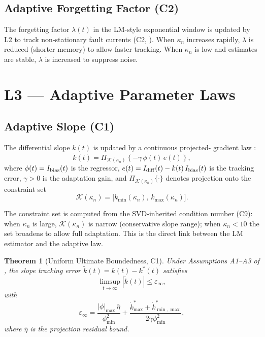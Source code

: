 \documentclass[journal,twoside,10pt]{IEEEtran}
\newcommand{\kappan}{\kappa_{n}}
\newcommand{\calK}{\mathcal{K}}
\newcommand{\Proj}[1]{\Pi_{#1}}
\newtheorem{theorem}{Theorem}
\begin{document}
\subsection{Adaptive Forgetting Factor (C2)}

The forgetting factor $\lambda(t)$ in the LM-style exponential window
is updated by L2 to track non-stationary fault currents (C2,
\cite{sambps_c2_adaptive_lambda}).  When $\kappan$ increases rapidly,
$\lambda$ is reduced (shorter memory) to allow faster tracking.
When $\kappan$ is low and estimates are stable, $\lambda$ is increased
to suppress noise.

\section{L3 — Adaptive Parameter Laws}
\label{sec:L3}

\subsection{Adaptive Slope (C1)}

The differential slope $k(t)$ is updated by a continuous projected-
gradient law \cite{sambps_c1_adaptive_slope}:
\begin{equation}
\label{eq:adaptive_slope}
  \dot{k}(t) = \Proj{\calK(\kappan)}\!\left\{
    -\gamma\,\phi(t)\,e(t)\right\},
\end{equation}
where $\phi(t) = I_{\rm bias}(t)$ is the regressor, $e(t) = I_{\rm diff}(t)
- k(t)\,I_{\rm bias}(t)$ is the tracking error, $\gamma > 0$ is the
adaptation gain, and $\Proj{\calK(\kappan)}\{\cdot\}$ denotes
projection onto the constraint set
\[
  \calK(\kappan) = \bigl[k_{\min}(\kappan),\, k_{\max}(\kappan)\bigr].
\]

The constraint set is computed from the SVD-inherited condition number
(C9): when $\kappan$ is large, $\calK(\kappan)$ is narrow (conservative
slope range); when $\kappan < 10$ the set broadens to allow full
adaptation.  This is the direct link between the LM estimator and the
adaptive law.

\begin{theorem}[Uniform Ultimate Boundedness, C1]
Under Assumptions A1--A3 of \cite{sambps_c1_adaptive_slope}, the
slope tracking error $\tilde{k}(t) = k(t) - k^*(t)$ satisfies
\[
  \limsup_{t\to\infty} |\tilde{k}(t)| \leq \varepsilon_\infty,
\]
with
\[
  \varepsilon_\infty =
    \frac{|\phi|_{\max}\,\bar{\eta}}{\phi^2_{\min}}
    + \frac{\dot{k}^*_{\max} + \dot{k}^*_{\min,\max}}{2\gamma\phi^2_{\min}},
\]
where $\bar{\eta}$ is the projection residual bound.
\end{theorem}
\end{document}
